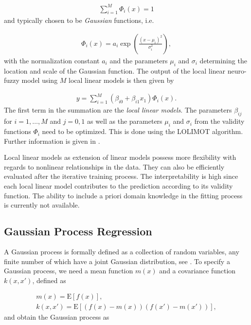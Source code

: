 \begin{align} \label{eq:LILOMOT-normalized-basis-fucntions}
	\sum_{i=1}^M \Phi_i(x) = 1
\end{align}
%
and typically chosen to be \emph{Gaussian} functions, i.e. 

\begin{align} \label{eq:validity-function}
	\Phi_i(x) = a_i \exp \left(\frac{(x - \mu_i)^2}{\sigma_i^2} \right),	
\end{align}
%
with the normalization constant $a_i$ and the parameters $\mu_i$ and $\sigma_i$ determining the location and scale of the Gaussian function. The output of the local linear neuro-fuzzy model using $M$ local linear models is then given by

\begin{align} \label{eq:LOLIMOT}
	y = \sum_{i=1}^M \left(\beta_{i0} + \beta_{i1} x_1\right) \Phi_i(x).
\end{align}
%
The first term in the summation are the \emph{local linear models}. The parameters $\beta_{ij}$ for $i=1, \dots, M$ and $j=0, 1$ as well as the parameters $\mu_i$ and $\sigma_i$ from the validity functions $\Phi_i$ need to be optimized. This is done using the LOLIMOT algorithm. Further information is given in \cite{nelles2013nonlinear}. 

Local linear models as extension of linear models possess more flexibility with regards to nonlinear relationships in the data. They can also be efficiently evaluated after the iterative training process. The interpretability is high since each local linear model contributes to the prediction according to its validity function. The ability to include a priori domain knowledge in the fitting process is currently not available.   

\subsection{Gaussian Process Regression}

A Gaussian process is formally defined as a collection of random variables, any finite number of which have a joint Gaussian distribution, see \cite{rasmussen2005GPforML}. To specify a Gaussian process, we need a mean function $m(x)$ and a covariance function $k(x, x')$, defined as

\begin{align}
	m(x) = \text{E}[f(x)], \\
	k(x,x') = \text{E}\left[ (f(x) - m(x))(f(x') - m(x')) \right],
\end{align}
% 
and obtain the Gaussian process as

